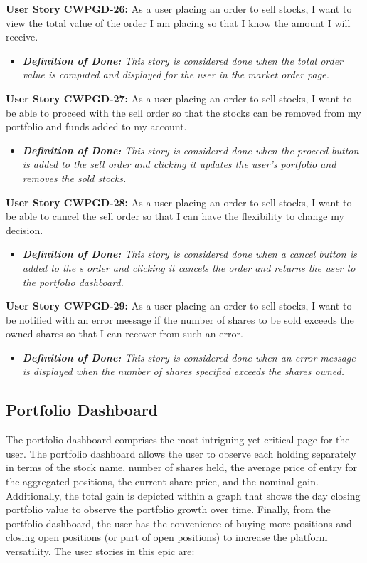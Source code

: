 \noindent \textbf{User Story CWPGD-26:} As a user placing an order to sell stocks, I want to view the total value of the order I am placing so that I know the amount I will receive.
\begin{itemize}
	\item \textit{\textbf{Definition of Done:} This story is considered done when the total order value is computed and displayed for the user in the market order page.} 
\end{itemize}

\noindent \textbf{User Story CWPGD-27:} As a user placing an order to sell stocks, I want to be able to proceed with the sell order so that the stocks can be removed from my portfolio and funds added to my account.
\begin{itemize}
	\item \textit{\textbf{Definition of Done:} This story is considered done when the proceed button is added to the sell order and clicking it updates the user’s portfolio and removes the sold stocks.} 
\end{itemize}

\noindent \textbf{User Story CWPGD-28:} As a user placing an order to sell stocks, I want to be able to cancel the sell order so that I can have the flexibility to change my decision.
\begin{itemize}
	\item \textit{\textbf{Definition of Done:} This story is considered done when a cancel button is added to the s order and clicking it cancels the order and returns the user to the portfolio dashboard.} 
\end{itemize}

\noindent \textbf{User Story CWPGD-29:} As a user placing an order to sell stocks, I want to be notified with an error message if the number of shares to be sold exceeds the owned shares so that I can recover from such an error.
\begin{itemize}
	\item \textit{\textbf{Definition of Done:} This story is considered done when an error message is displayed when the number of shares specified exceeds the shares owned.} 
\end{itemize}

\subsection{Portfolio Dashboard}
    \label{subsec:portfolio_dashboard}

The portfolio dashboard comprises the most intriguing yet critical page for the user. The portfolio dashboard allows the user to observe each holding separately in terms of the stock name, number of shares held, the average price of entry for the aggregated positions, the current share price, and the nominal  gain. Additionally, the total gain is depicted within a graph that shows the day closing portfolio value to observe the portfolio growth over time. Finally, from the portfolio dashboard, the user has the convenience of buying more positions and closing open positions (or part of open positions) to increase the platform versatility. The user stories in this epic are:\\

